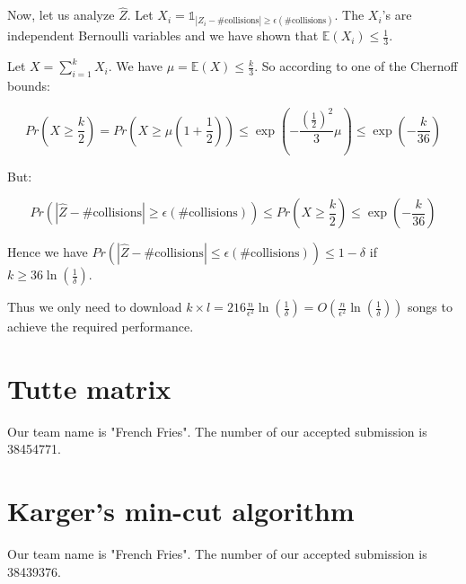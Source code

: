 \documentclass[10pt,a4paper]{article}
\theoremstyle{plain}
\begin{document}
Now, let us analyze $\hat{Z}$. Let $X_i = \mathds{1}_{|Z_i - \text{\# collisions}| \geq \epsilon (\text{\# collisions})}$. The $X_i$'s are independent Bernoulli variables and we have shown that $\mathbb{E}(X_i) \leq \frac{1}{3}$.

Let $X = \sum_{i = 1}^k{X_i}$. We have $\mu = \mathbb{E}(X) \leq \frac{k}{3}$. So according to one of the Chernoff bounds:

$$
Pr(X \geq \frac{k}{2}) = Pr(X \geq \mu(1 + \frac{1}{2})) \leq \exp(-\frac{(\frac{1}{2})^2}{3}\mu) \leq \exp(-\frac{k}{36})
$$

But:

$$
Pr(|\hat{Z} - \text{\# collisions}| \geq \epsilon (\text{\# collisions})) \leq Pr(X \geq \frac{k}{2}) \leq \exp(-\frac{k}{36})
$$

Hence we have $Pr(|\hat{Z} - \text{\# collisions}| \leq \epsilon (\text{\# collisions})) \leq 1 - \delta$ if $k \geq 36\ln(\frac{1}{\delta})$.

Thus we only need to download $k \times l = 216\frac{n}{\epsilon^2}\ln(\frac{1}{\delta}) = O(\frac{n}{\epsilon^2}\ln(\frac{1}{\delta}))$ songs to achieve the required performance.

\section{Tutte matrix}

Our team name is "French Fries". The number of our accepted submission is
38454771.

\section{Karger's min-cut algorithm}

Our team name is "French Fries". The number of our accepted submission is
38439376.
\end{document}
